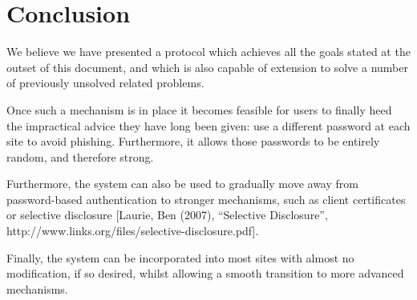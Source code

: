 \documentclass[a4paper,titlepage]{article}
\begin{document}
\section{Conclusion}

We believe we have presented a protocol which achieves all the goals
stated at the outset of this document, and which is also capable of
extension to solve a number of previously unsolved related problems.

Once such a mechanism is in place it becomes feasible for users to
finally heed the impractical advice they have long been given: use a
different password at each site to avoid phishing. Furthermore, it
allows those passwords to be entirely random, and therefore strong.

Furthermore, the system can also be used to gradually move away from
password-based authentication to stronger mechanisms, such as client
certificates or selective disclosure [Laurie, Ben (2007), ``Selective
  Disclosure'', http://www.links.org/files/selective-disclosure.pdf].

Finally, the system can be incorporated into most sites with almost no
modification, if so desired, whilst allowing a smooth transition to
more advanced mechanisms.
\end{document}
